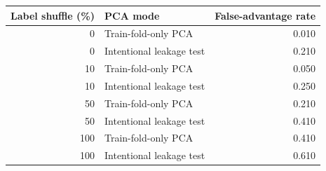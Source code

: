 \begin{tabular}{rlr}
\hline
Label shuffle (\%) & PCA mode & False-advantage rate \\
\hline
0 & Train-fold-only PCA & 0.010 \\
0 & Intentional leakage test & 0.210 \\
10 & Train-fold-only PCA & 0.050 \\
10 & Intentional leakage test & 0.250 \\
50 & Train-fold-only PCA & 0.210 \\
50 & Intentional leakage test & 0.410 \\
100 & Train-fold-only PCA & 0.410 \\
100 & Intentional leakage test & 0.610 \\
\hline
\end{tabular}
